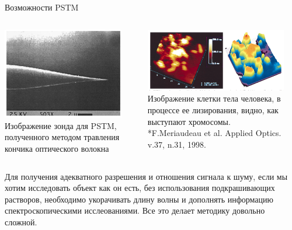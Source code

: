 \documentclass[9pt, compress, xcolor=table]{beamer}
\begin{document}
\begin{frame}{Возможности PSTM}
\begin{columns}[c]
\column{6.5cm}
\begin{center}
\includegraphics[width=0.9\textwidth]{nfm30}
\newline Изображение зонда для  PSTM, полученного методом травления кончика оптического волокна
\end{center}

\column{6.5cm}
\begin{center}
\includegraphics[width=0.9\textwidth]{nfm31}
\newline Изображение клетки тела человека, в процессе ее лизирования, видно, как выступают хромосомы. \\*\colorbox{yellow!30}{\small{F.Meriaudeau et al. Applied Optics. v.37, n.31, 1998.}}
\end{center}

\end{columns}

Для получения адекватного разрешения и отношения сигнала к шуму, если мы хотим исследовать объект как он есть, без использования подкрашивающих растворов, необходимо укорачивать длину волны и дополнять информацию спектроскопическими исслеованиями. Все это делает методику довольно сложной.

\end{frame}
\end{document}
